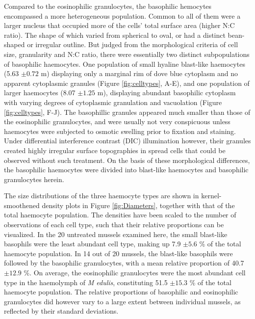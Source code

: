 Compared to the eosinophilic granulocytes, the basophilic hemocytes encompassed a more heterogeneous population. Common to all of them were a larger nucleus that occupied more of the cells' total surface area (higher N:C ratio). The shape of which varied from spherical to oval, or had a distinct bean-shaped or irregular outline. But judged from the morphological criteria of cell size, granularity and N:C ratio, there were essentially two distinct subpopulations of basophilic haemocytes. One population of small hyaline blast-like haemocytes (5.63 $\pm{0.72}$ \micro m) displaying only a marginal rim of dove blue cytoplasm and no apparent cytoplasmic granules (Figure \ref{fig:celltypes}, A-E), and one population of larger haemocytes (8.07 $\pm{1.25}$ \micro m), displaying abundant basophilic cytoplasm with varying degrees of cytoplasmic granulation and vacuolation (Figure \ref{fig:celltypes}, F-J). The basophillic granules appeared much smaller than those of the eosinophilic granulocytes, and were usually not very conspicuous unless haemocytes were subjected to osmotic swelling prior to fixation and staining. Under differential interference contrast (DIC) illumination however, their granules created highly irregular surface topographies in spread cells that could be observed without such treatment. On the basis of these morphological differences, the basophilic haemocytes were divided into blast-like haemocytes and basophilic granulocytes herein. 

The size distributions of the three haemocyte types are shown in kernel-smoothened density plots in Figure \ref{fig:Diameters}, together with that of the total haemocyte population. The densities have been scaled to the number of observations of each cell type, such that their relative proportions can be visualized. In the 20 untreated mussels examined here, the small blast-like basophils were the least abundant cell type, making up 7.9 $\pm{5.6}$ \% of the total haemocyte population. In 14 out of 20 mussels, the blast-like basophils were followed by the basophilic granulocytes, with a mean relative proportion of 40.7 $\pm{12.9}$ \%. On average, the eosinophilic granulocytes were the most abundant cell type in the haemolymph of \emph{M edulis}, constituting 51.5 $\pm{15.3}$ \% of the total haemocyte population. The relative proportions of basophilic and eosinophilic granulocytes did however vary to a large extent between individual mussels, as reflected by their standard deviations.

